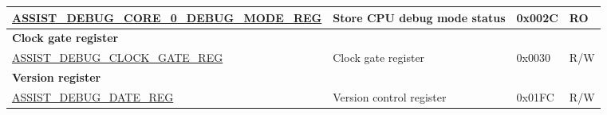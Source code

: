 \begin{longtable}{ | p{10cm} | p{4cm} | p{1.2cm} | p{1cm} | }
\hyperref[regdesc:ASSISTDEBUGCORE0DEBUGMODEREG]{ASSIST\_DEBUG\_CORE\_0\_DEBUG\_MODE\_REG} & Store CPU debug mode status & 0x002C & RO \\ \hline
\multicolumn{4}{|l|}{\textbf{Clock gate register}} \\ \hline
\hyperref[regdesc:ASSISTDEBUGCLOCKGATEREG]{ASSIST\_DEBUG\_CLOCK\_GATE\_REG} & Clock gate register & 0x0030 & R/W \\ \hline
\multicolumn{4}{|l|}{\textbf{Version register}} \\ \hline
\hyperref[regdesc:ASSISTDEBUGDATEREG]{ASSIST\_DEBUG\_DATE\_REG} & Version control register & 0x01FC & R/W \\ \hline
\end{longtable}
